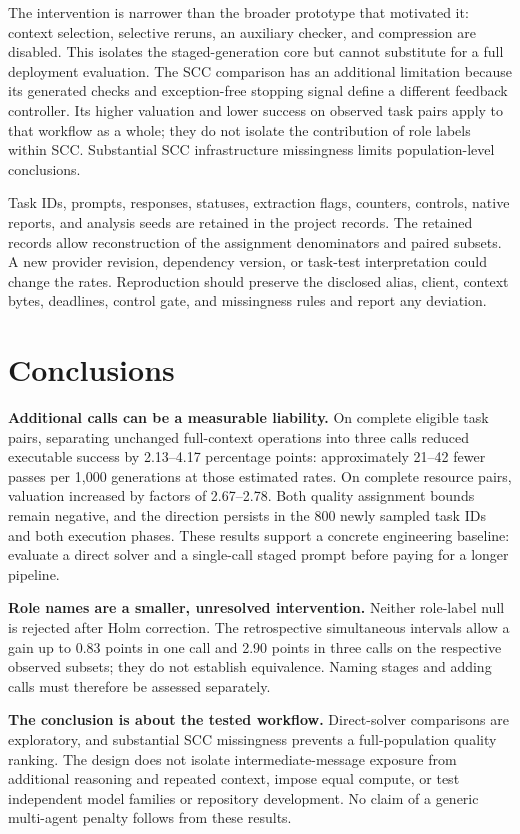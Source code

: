 \documentclass[10pt,letterpaper]{article}
\begin{document}
The intervention is narrower than the broader prototype that motivated it: context selection, selective reruns, an auxiliary checker, and compression are disabled. This isolates the staged-generation core but cannot substitute for a full deployment evaluation. The SCC comparison has an additional limitation because its generated checks and exception-free stopping signal define a different feedback controller. Its higher valuation and lower success on observed task pairs apply to that workflow as a whole; they do not isolate the contribution of role labels within SCC. Substantial SCC infrastructure missingness limits population-level conclusions.

Task IDs, prompts, responses, statuses, extraction flags, counters, controls, native reports, and analysis seeds are retained in the project records. The retained records allow reconstruction of the assignment denominators and paired subsets. A new provider revision, dependency version, or task-test interpretation could change the rates. Reproduction should preserve the disclosed alias, client, context bytes, deadlines, control gate, and missingness rules and report any deviation.

\section*{Conclusions}
\textbf{Additional calls can be a measurable liability.} On complete eligible task pairs, separating unchanged full-context operations into three calls reduced executable success by 2.13--4.17 percentage points: approximately 21--42 fewer passes per 1,000 generations at those estimated rates. On complete resource pairs, valuation increased by factors of 2.67--2.78. Both quality assignment bounds remain negative, and the direction persists in the 800 newly sampled task IDs and both execution phases. These results support a concrete engineering baseline: evaluate a direct solver and a single-call staged prompt before paying for a longer pipeline.

\textbf{Role names are a smaller, unresolved intervention.} Neither role-label null is rejected after Holm correction. The retrospective simultaneous intervals allow a gain up to 0.83 points in one call and 2.90 points in three calls on the respective observed subsets; they do not establish equivalence. Naming stages and adding calls must therefore be assessed separately.

\textbf{The conclusion is about the tested workflow.} Direct-solver comparisons are exploratory, and substantial SCC missingness prevents a full-population quality ranking. The design does not isolate intermediate-message exposure from additional reasoning and repeated context, impose equal compute, or test independent model families or repository development. No claim of a generic multi-agent penalty follows from these results.
\end{document}
